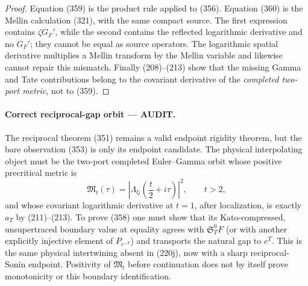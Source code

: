 \documentclass[11pt]{article}
\newcommand{\AUDIT}{\textcolor{orange!75!black}{\textbf{AUDIT}}}
\begin{document}
\begin{proof}
Equation (359) is the product rule applied to (356).  Equation (360) is the
Mellin calculation (321), with the same compact source.  The first expression
contains $\zeta G_F'$, while the second contains the reflected logarithmic
derivative and no $G_F'$; they cannot be equal as source operators.  The
logarithmic spatial derivative multiplies a Mellin transform by the Mellin
variable and likewise cannot repair this mismatch.  Finally (208)--(213)
show that the missing Gamma and Tate contributions belong to the covariant
derivative of the \emph{completed two-port metric}, not to (359).
\end{proof}

\paragraph{Correct reciprocal-gap orbit --- \AUDIT.}
The reciprocal theorem (351) remains a valid endpoint rigidity theorem, but
the bare observation (353) is only its endpoint candidate.  The physical
interpolating object must be the two-port completed Euler--Gamma orbit whose
positive precritical metric is
\[
 \mathfrak M_t(\tau)
 =\left|\Lambda_{\mathbb Q}
       \left(\frac t2+i\tau\right)\right|^2,
 \qquad t>2,
\]
and whose covariant logarithmic derivative at $t=1$, after localization, is
exactly $a_T$ by (211)--(213).  To prove (358) one must show that its
Kato-compressed, unsupertraced boundary value at equality agrees with
$\mathfrak S_T^0F$ (or with another explicitly injective element of
$P_{e^{-T}}$) and transports the natural gap to $e^T$.  This is the same
physical intertwining absent in (220j), now with a sharp reciprocal-Sonin
endpoint.  Positivity of $\mathfrak M_t$ before continuation does not by
itself prove monotonicity or this boundary identification.
\end{document}

